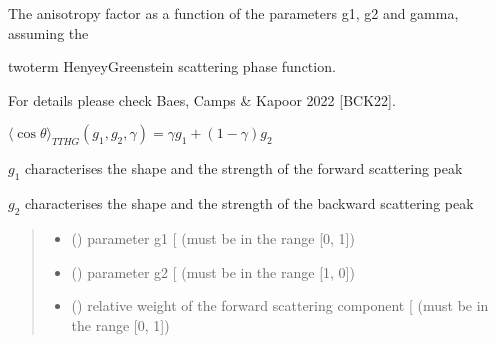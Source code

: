 \documentclass[letterpaper,10pt,english]{sphinxmanual}
\begin{document}

\begin{fulllineitems}
\label{\detokenize{06_anisotropy_factor:skinoptics.anisotropy_factor.costheta_TTHG}}
\pysigstartsignatures
{}
\pysigstopsignatures
\begin{DUlineblock}{0em}
\item[] The anisotropy factor as a function of the parameters g1, g2 and gamma, assuming the
\item[] two\sphinxhyphen{}term Henyey\sphinxhyphen{}Greenstein scattering phase function.
\item[] For details please check Baes, Camps \& Kapoor 2022 {[}BCK22{]}.
\end{DUlineblock}

\sphinxAtStartPar
\(\langle \cos\theta \rangle_{TTHG}(g_1, g_2, \gamma) = \gamma g_1 + (1 - \gamma) g_2\)

\sphinxAtStartPar
\(g_1\) characterises the shape and the strength of the forward scattering peak

\sphinxAtStartPar
\(g_2\) characterises the shape and the strength of the backward scattering peak
\begin{quote}\begin{description}
\begin{itemize}
\item {} 
\sphinxAtStartPar
{} () \textendash{} parameter g1 {[}\sphinxhyphen{}{]} (must be in the range {[}0, 1{]})

\item {} 
\sphinxAtStartPar
{} () \textendash{} parameter g2 {[}\sphinxhyphen{}{]} (must be in the range {[}\sphinxhyphen{}1, 0{]})

\item {} 
\sphinxAtStartPar
{} () \textendash{} relative weight of the forward scattering component {[}\sphinxhyphen{}{]} (must be in the range {[}0, 1{]})


\end{itemize}
\end{description}
\end{quote}
\end{fulllineitems}
\end{document}
